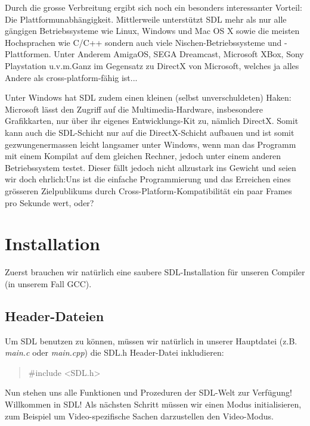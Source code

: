 \documentclass[b5paper,10pt,dvips,fleqn,titlepage,twoside]{book}
\begin{document}
Durch die grosse Verbreitung ergibt sich noch ein besonders interessanter Vorteil: Die Plattformunabh\"{a}ngigkeit. Mittlerweile unterst\"{u}tzt SDL mehr als nur alle g\"{a}ngigen Betriebssysteme wie Linux, Windows und Mac OS X sowie die meisten Hochsprachen wie C/C++ sondern auch viele Nischen-Betriebssysteme und -Plattformen. Unter Anderem AmigaOS, SEGA Dreamcast, Microsoft XBox, Sony Playstation u.v.m.\newline Ganz im Gegensatz zu DirectX von Microsoft, welches ja alles Andere als cross-platform-f\"{a}hig ist...

Unter Windows hat SDL zudem einen kleinen (selbst unverschuldeten) Haken: Microsoft l\"{a}sst den Zugriff auf die Multimedia-Hardware, insbesondere Grafikkarten, nur \"{u}ber ihr eigenes Entwicklungs-Kit zu, n\"{a}mlich DirectX. Somit kann auch die SDL-Schicht nur auf die DirectX-Schicht aufbauen und ist somit gezwungenermassen leicht langsamer unter Windows, wenn man das Programm mit einem Kompilat auf dem gleichen Rechner, jedoch unter einem anderen Betriebssystem testet. Dieser f\"{a}llt jedoch nicht allzustark ins Gewicht und seien wir doch ehrlich:\newline Uns ist die einfache Programmierung und das Erreichen eines gr\"{o}sseren Zielpublikums durch Cross-Platform-Kompatibilit\"{a}t ein paar Frames pro Sekunde wert, oder?
\newpage
\section{Installation}
Zuerst brauchen wir nat\"{u}rlich eine saubere SDL-Installation f\"{u}r unseren Compiler (in unserem Fall GCC).
\newpage
\subsection{Header-Dateien}
Um SDL benutzen zu k\"{o}nnen, m\"{u}ssen wir nat\"{u}rlich in unserer Hauptdatei (z.B. \emph{main.c} oder \emph{main.cpp}) die SDL.h Header-Datei inkludieren:
\begin{quote}
	\#include <SDL.h>
\end{quote}
Nun stehen uns alle Funktionen und Prozeduren der SDL-Welt zur Verf\"{u}gung! Willkommen in SDL!
Als n\"{a}chsten Schritt m\"{u}ssen wir einen Modus initialisieren, zum Beispiel um Video-spezifische Sachen darzustellen den Video-Modus.
\end{document}
